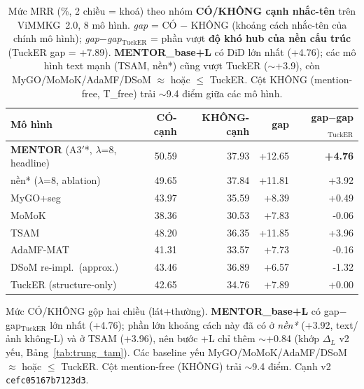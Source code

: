 \begin{table}[t]
\centering
\footnotesize
\setlength{\tabcolsep}{5pt}
\caption{Mức MRR (\%, 2 chiều = khoá) theo nhóm \textbf{CÓ/KHÔNG cạnh nhắc-tên} trên ViMMKG~2.0, 8 mô hình. \emph{gap} = CÓ $-$ KHÔNG (khoảng cách nhắc-tên của chính mô hình); \emph{gap$-$gap$_{\text{TuckER}}$} = phần vượt \textbf{độ khó hub của nền cấu trúc} (TuckER gap = +7.89). \textbf{MENTOR\_base+L} có DiD lớn nhất (+4.76); các mô hình text mạnh (TSAM, nền*) cũng vượt TuckER ($\sim$+3.9), còn MyGO/MoMoK/AdaMF/DSoM $\approx$ hoặc $\le$ TuckER. Cột KHÔNG (mention-free, T\_free) trải $\sim$9.4 điểm giữa các mô hình.}
\label{tab:canh_v2}
\begin{tabular}{l r r r r}
\toprule
Mô hình & CÓ-cạnh & KHÔNG-cạnh & gap & gap$-$gap$_{\text{TuckER}}$ \\
\midrule
\textbf{MENTOR} (A3$'$*, $\lambda$=8, headline) & 50.59 & 37.93 & +12.65 & \textbf{+4.76} \\
nền* ($\lambda$=8, ablation) & 49.65 & 37.84 & +11.81 & +3.92 \\
MyGO+seg & 43.97 & 35.59 & +8.39 & +0.49 \\
MoMoK & 38.36 & 30.53 & +7.83 & -0.06 \\
TSAM & 48.20 & 36.35 & +11.85 & +3.96 \\
AdaMF-MAT & 41.31 & 33.57 & +7.73 & -0.16 \\
DSoM re-impl.\ (approx.) & 43.46 & 36.89 & +6.57 & -1.32 \\
TuckER (structure-only) & 42.65 & 34.76 & +7.89 & +0.00 \\
\bottomrule
\end{tabular}
\vspace{2pt}
\begin{minipage}{\linewidth}\footnotesize\raggedright
Mức CÓ/KHÔNG gộp hai chiều (lát+thường). \textbf{MENTOR\_base+L} có gap$-$gap$_{\text{TuckER}}$ lớn nhất (+4.76); phần lớn khoảng cách này đã có ở \emph{nền*} (+3.92, text/ảnh không-L) và ở TSAM (+3.96), nên bước +L chỉ thêm $\sim$+0.84 (khớp $\Delta_L$ v2 yếu, Bảng~\ref{tab:trung_tam}). Các baseline yếu MyGO/MoMoK/AdaMF/DSoM $\approx$ hoặc $\le$ TuckER. Cột mention-free (KHÔNG) trải $\sim$9.4 điểm. Cạnh v2 \texttt{cefc05167b7123d3}.
\end{minipage}
\end{table}
